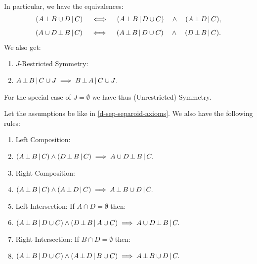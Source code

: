 \begin{DefThm}
In particular, we have the equivalences:
$$ (A \operatorname*{\perp}  B \cup D \operatorname*{|} C) \quad\iff\quad (A \operatorname*{\perp}  B \operatorname*{|} D \cup C) \quad\land\quad (A \operatorname*{\perp}  D \operatorname*{|} C)  ,$$
$$ (A \cup D \operatorname*{\perp}  B \operatorname*{|} C) \quad\iff\quad (A \operatorname*{\perp}  B \operatorname*{|} D \cup C) \quad\land\quad (D \operatorname*{\perp}  B \operatorname*{|} C).$$
We also get:
\begin{enumerate}[resume,label=\alph*)]
    \item $J$-Restricted Symmetry: 
	\item[] $A \operatorname*{\perp}  B \operatorname*{|} C \cup J \implies B \operatorname*{\perp} A \operatorname*{|} C \cup J$. 
\end{enumerate}
For the special case of $J=\emptyset$ we have thus (Unrestricted) Symmetry.
\end{DefThm}


\begin{Rem}
Let the assumptions be like in \ref{d-sep-separoid-axioms}.
    We also have the following rules: 
    \begin{enumerate}[resume,label=\alph*)]
        \item[l)] Left Composition:
        \item[] $(A \operatorname*{\perp}  B \operatorname*{|}  C) \land (D \operatorname*{\perp}  B \operatorname*{|} C) \implies A \cup D \operatorname*{\perp}  B \operatorname*{|} C.$
        \item[m)] Right Composition:
        \item[] $(A \operatorname*{\perp}  B \operatorname*{|}  C) \land (A \operatorname*{\perp}  D \operatorname*{|} C) \implies A \operatorname*{\perp}  B \cup  D \operatorname*{|} C.$
         \item[n)] Left Intersection: If $A \cap D = \emptyset$ then:
        \item[] $(A \operatorname*{\perp}  B \operatorname*{|} D \cup  C) \land (D \operatorname*{\perp}  B \operatorname*{|} A \cup C) \implies A \cup D \operatorname*{\perp}  B \operatorname*{|} C.$       
        \item[m)] Right Intersection: If $B \cap D = \emptyset$ then:
        \item[] $(A \operatorname*{\perp}  B \operatorname*{|} D \cup  C) \land (A \operatorname*{\perp}  D \operatorname*{|} B \cup C) \implies A \operatorname*{\perp}  B \cup D \operatorname*{|} C.$
    \end{enumerate}
\end{Rem}
